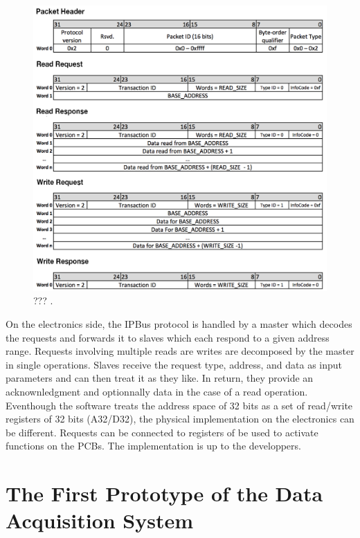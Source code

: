       \begin{figure}[h!]
        \centering
        \includegraphics[width=\textwidth]{img/II-2-daq/ipbus.png}
        \caption{??? \cite{AMC13}.}
        \label{fig:II-2-daq-ipbus}
      \end{figure}

      On the electronics side, the IPBus protocol is handled by a master which decodes the requests and forwards it to slaves which each respond to a given address range. Requests involving multiple reads are writes are decomposed by the master in single operations. Slaves receive the request type, address, and data as input parameters and can then treat it as they like. In return, they provide an acknownledgment and optionnally data in the case of a read operation. Eventhough the software treats the address space of 32 bits as a set of read/write registers of 32 bits (A32/D32), the physical implementation on the electronics can be different. Requests can be connected to registers of be used to activate functions on the PCBs. The implementation is up to the developpers.

  \section{The First Prototype of the Data Acquisition System}

